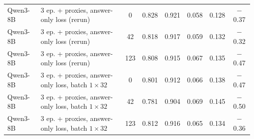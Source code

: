 \begin{table}[!htbp]
{\begin{tabular}{llcccccc}
\midrule
Qwen3-8B & 3 ep. + proxies, answer-only loss (rerun) & 0 & 0.828 & 0.921 & 0.058 & 0.128 & $-$0.37 \\
Qwen3-8B & 3 ep. + proxies, answer-only loss (rerun) & 42 & 0.818 & 0.917 & 0.059 & 0.132 & $-$0.32 \\
Qwen3-8B & 3 ep. + proxies, answer-only loss (rerun) & 123 & 0.808 & 0.915 & 0.067 & 0.135 & $-$0.47 \\
\midrule
Qwen3-8B & 3 ep. + proxies, answer-only loss, batch $1\times32$ & 0 & 0.801 & 0.912 & 0.066 & 0.138 & $-$0.47 \\
Qwen3-8B & 3 ep. + proxies, answer-only loss, batch $1\times32$ & 42 & 0.781 & 0.904 & 0.069 & 0.145 & $-$0.50 \\
Qwen3-8B & 3 ep. + proxies, answer-only loss, batch $1\times32$ & 123 & 0.812 & 0.916 & 0.065 & 0.134 & $-$0.36 \\
\bottomrule
\end{tabular}
}
\end{table}
